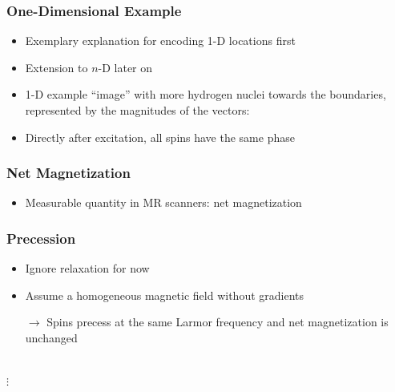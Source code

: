 \begin{frame}
	\frametitle{One-Dimensional Example}
	
	\begin{itemize}
		\item Exemplary explanation for encoding 1-D locations first
		\item Extension to $n$-D later on
		\item 1-D example ``image'' with more hydrogen nuclei towards the boundaries, represented by the magnitudes of the vectors:
	\end{itemize}
	
	\begin{center}
		\begingroup
		
		\endgroup
	\end{center}
	
	\begin{itemize}
		\item Directly after excitation, all spins have the same phase
	\end{itemize}
\end{frame}

\begin{frame}
	\frametitle{Net Magnetization}
	
	\begin{itemize}
		\item Measurable quantity in MR scanners: net magnetization
	\end{itemize}
	
	\begin{center}
		\begingroup
		
		\endgroup
	\end{center}
	
\end{frame}

\begin{frame}
	\frametitle{Precession}
	
	\begin{itemize}
		\item Ignore relaxation for now
		\item Assume a homogeneous magnetic field without gradients
		\item[$\rightarrow$] Spins precess at the same Larmor frequency and net magnetization is unchanged
	\end{itemize}
	
	\begin{center}
		\begingroup
		 \\
		$\vdots$
		\endgroup
	\end{center}
\end{frame}

